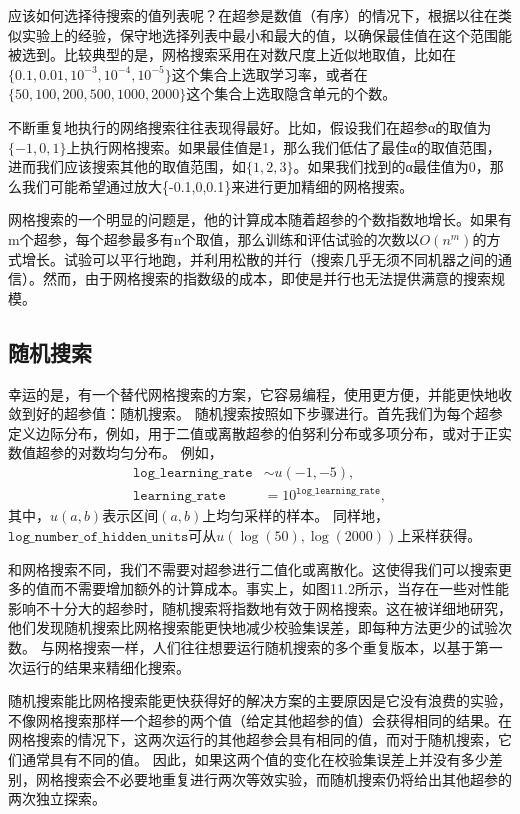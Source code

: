 应该如何选择待搜索的值列表呢？在超参是数值（有序）的情况下，根据以往在类似实验上的经验，保守地选择列表中最小和最大的值，以确保最佳值在这个范围能被选到。比较典型的是，网格搜索采用在对数尺度上近似地取值，比如在$\{0.1,0.01,10^{-3},10^{-4},10^{-5}\}$这个集合上选取学习率，或者在$\{50,100,200,500,1000,2000\}$这个集合上选取隐含单元的个数。

不断重复地执行的网络搜索往往表现得最好。比如，假设我们在超参α的取值为$\{-1,0,1\}$上执行网格搜索。如果最佳值是1，那么我们低估了最佳α的取值范围，进而我们应该搜索其他的取值范围，如$\{1,2,3\}$。如果我们找到的α最佳值为0，那么我们可能希望通过放大\{-0.1,0,0.1\}来进行更加精细的网格搜索。

网格搜索的一个明显的问题是，他的计算成本随着超参的个数指数地增长。如果有m个超参，每个超参最多有n个取值，那么训练和评估试验的次数以$O(n^m)$的方式增长。试验可以平行地跑，并利用松散的并行（搜索几乎无须不同机器之间的通信）。然而，由于网格搜索的指数级的成本，即使是并行也无法提供满意的搜索规模。

\subsection{随机搜索}
幸运的是，有一个替代网格搜索的方案，它容易编程，使用更方便，并能更快地收敛到好的超参值：随机搜索\citep{Bergstra+Bengio-2012-small}。
随机搜索按照如下步骤进行。首先我们为每个超参定义边际分布，例如，用于二值或离散超参的伯努利分布或多项分布，或对于正实数值超参的对数均匀分布。 例如，
\begin{align}
        \texttt{log\_learning\_rate} &\sim u(-1, -5), \\
        \texttt{learning\_rate} &= 10^{\texttt{log\_learning\_rate}},
\end{align}
其中，$u(a,b)$表示区间$(a,b)$上均匀采样的样本。
同样地，$\texttt{log\_number\_of\_hidden\_units}$可从$u(\log(50), \log(2000))$上采样获得。

和网格搜索不同，我们不需要对超参进行二值化或离散化。这使得我们可以搜索更多的值而不需要增加额外的计算成本。事实上，如图11.2所示，当存在一些对性能影响不十分大的超参时，随机搜索将指数地有效于网格搜索。这在\cite{Bergstra+Bengio-2012-small}被详细地研究，他们发现随机搜索比网格搜索能更快地减少校验集误差，即每种方法更少的试验次数。
与网格搜索一样，人们往往想要运行随机搜索的多个重复版本，以基于第一次运行的结果来精细化搜索。

随机搜索能比网格搜索能更快获得好的解决方案的主要原因是它没有浪费的实验，不像网格搜索那样一个超参的两个值（给定其他超参的值）会获得相同的结果。在网格搜索的情况下，这两次运行的其他超参会具有相同的值，而对于随机搜索，它们通常具有不同的值。 因此，如果这两个值的变化在校验集误差上并没有多少差别，网格搜索会不必要地重复进行两次等效实验，而随机搜索仍将给出其他超参的两次独立探索。


